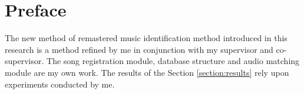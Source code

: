 \chapter*{Preface}

The new method of remastered music identification method introduced
in this research is a method refined by me in conjunction with my supervisor
and co-supervisor. The song registration module, database structure and 
audio matching module are  my own work. The results of the Section \ref{section:results}
rely upon experiments conducted by me. 